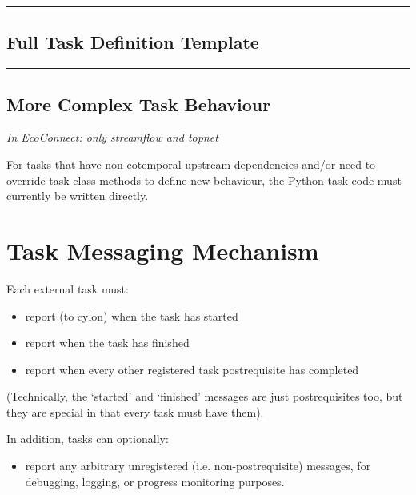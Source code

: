 \documentclass[11pt,a4paper]{article}
\begin{document}
\lstset{language=sh, numbers=left}

{\tiny
\noindent
\rule{5cm}{.2mm}

}

\subsection{Full Task Definition Template}

\lstset{language=sh, numbers=left}

{\tiny
\noindent
\rule{5cm}{.2mm}

}

\subsection{More Complex Task Behaviour}

\textit{In EcoConnect: only streamflow and topnet}

For tasks that have non-cotemporal upstream dependencies and/or need to  
override task class methods to define new behaviour, the Python task
code must currently be written directly. 

\section{Task Messaging Mechanism}

Each external task must:

\begin{itemize}
\item report (to cylon) when the task has started
\item report when the task has finished
\item report when every other registered task postrequisite has
completed
\end{itemize}

(Technically, the `started' and `finished' messages are just
postrequisites too, but they are special in that every task
must have them).

In addition, tasks can optionally:

\begin{itemize}
\item report any arbitrary unregistered (i.e. non-postrequisite)
messages, for debugging, logging, or progress monitoring purposes.
\end{itemize}
\end{document}
